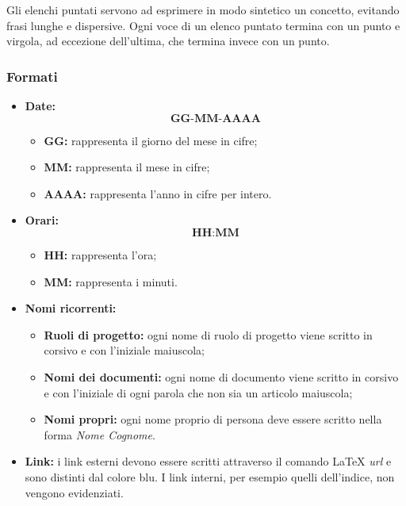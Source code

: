 \documentclass[../NormediProgetto.tex]{subfiles}
\begin{document}
Gli elenchi puntati servono ad esprimere in modo sintetico un concetto, evitando frasi lunghe e dispersive. Ogni voce di un elenco puntato termina con un punto e virgola, ad eccezione dell'ultima, che termina invece con un punto.

\subsubsection{Formati}

\begin{itemize}
	
	\item{\textbf{Date:}}  \[\textbf{GG-MM-AAAA}\]
	\begin{itemize}
		\item{\textbf{GG:}} rappresenta il giorno del mese in cifre;
		\item{\textbf{MM:}} rappresenta il mese in cifre;
		\item{\textbf{AAAA:}} rappresenta l'anno in cifre per intero.
		
	\end{itemize}
	
	\item{\textbf{Orari:}} \[\textbf{HH:MM}\]
	\begin{itemize}
		\item{\textbf{HH:}} rappresenta l'ora;
		\item{\textbf{MM:}} rappresenta i minuti.
	\end{itemize}
	
	\item{\textbf{Nomi ricorrenti:}}
	\begin{itemize}
		\item{\textbf{Ruoli di progetto:}} ogni nome di ruolo di progetto viene scritto in corsivo e con l’iniziale maiuscola;
		\item{\textbf{Nomi dei documenti:}} ogni nome di documento viene scritto in corsivo e con l’iniziale di ogni parola che non sia un articolo maiuscola;
		\item{\textbf{Nomi propri:}} ogni nome proprio di persona deve essere scritto nella forma \textit{Nome Cognome}.
	\end{itemize}
	
	\item{\textbf{Link:}} i link esterni devono essere scritti attraverso il comando \LaTeX{} \textit{url} e sono distinti dal colore blu. I link interni, per esempio quelli dell'indice, non vengono evidenziati.
\end{itemize}
\end{document}
